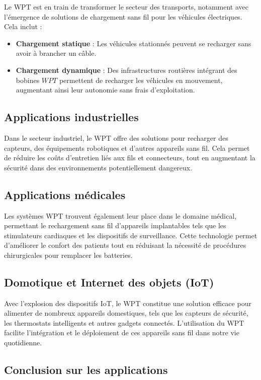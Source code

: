 \documentclass[12pt,a4paper,titlepage,notitlepage]{article}
\begin{document}
	Le WPT est en train de transformer le secteur des transports, notamment avec l'émergence de solutions de chargement sans fil pour les véhicules électriques. Cela inclut :
	\begin{itemize}
		\item \textbf{Chargement statique} : Les véhicules stationnés peuvent se recharger sans avoir à brancher un câble.
		\item \textbf{Chargement dynamique} : Des infrastructures routières intégrant des bobines $WPT$ permettent de recharger les véhicules en mouvement, augmentant ainsi leur autonomie sans frais d'exploitation.
	\end{itemize}
	
	\subsection{Applications industrielles}
	
	Dans le secteur industriel, le WPT offre des solutions pour recharger des capteurs, des équipements robotiques et d'autres appareils sans fil. Cela permet de réduire les coûts d'entretien liés aux fils et connecteurs, tout en augmentant la sécurité dans des environnements potentiellement dangereux.
	
	\subsection{Applications médicales}
	
	Les systèmes WPT trouvent également leur place dans le domaine médical, permettant le rechargement sans fil d'appareils implantables tels que les stimulateurs cardiaques et les dispositifs de surveillance. Cette technologie permet d'améliorer le confort des patients tout en réduisant la nécessité de procédures chirurgicales pour remplacer les batteries.
	
	\subsection{Domotique et Internet des objets (IoT)}
	
	Avec l'explosion des dispositifs IoT, le WPT constitue une solution efficace pour alimenter de nombreux appareils domestiques, tels que les capteurs de sécurité, les thermostats intelligents et autres gadgets connectés. L'utilisation du WPT facilite l'intégration et le déploiement de ces appareils sans fil dans notre vie quotidienne.
	
	\subsection{Conclusion sur les applications}
	
\end{document}
